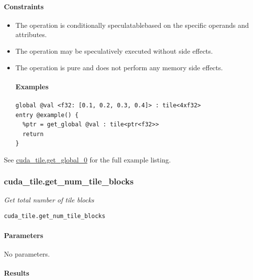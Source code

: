 \documentclass{article}
\begin{document}
\paragraph{Constraints}

\begin{itemize}
\item The operation is conditionally speculatablebased on the specific operands and attributes.
\item The operation may be speculatively executed without side effects.
\item The operation is pure and does not perform any memory side effects.


\paragraph{Examples}

\begin{lstlisting}
global @val <f32: [0.1, 0.2, 0.3, 0.4]> : tile<4xf32>
entry @example() {
  %ptr = get_global @val : tile<ptr<f32>>
  return
}
\end{lstlisting}

\end{itemize}
See \href{https://docs.nvidia.com/cuda/tile-ir/latest/sections/appendix.html#example-cuda-tile-get-global-0}{cuda\_tile.get\_global\_0} for the full example listing.



\subsubsection{cuda\_tile.get\_num\_tile\_blocks}

\textit{Get total number of tile blocks}


\begin{lstlisting}
cuda_tile.get_num_tile_blocks
\end{lstlisting}

\paragraph{Parameters}

No parameters.



\paragraph{Results}
\end{document}
